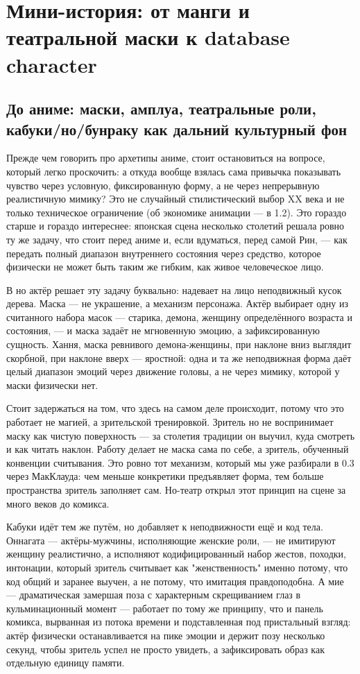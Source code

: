 \setcounter{chapter}{0}
\chapter{Мини-история: от манги и театральной маски к database character}

\section{До аниме: маски, амплуа, театральные роли, кабуки/но/бунраку как дальний культурный фон}

Прежде чем говорить про архетипы аниме, стоит остановиться на вопросе, который легко проскочить: а откуда вообще взялась сама привычка показывать чувство через условную, фиксированную форму, а не через непрерывную реалистичную мимику? Это не случайный стилистический выбор XX века и не только техническое ограничение (об экономике анимации — в 1.2). Это гораздо старше и гораздо интереснее: японская сцена несколько столетий решала ровно ту же задачу, что стоит перед аниме и, если вдуматься, перед самой Рин, — как передать полный диапазон внутреннего состояния через средство, которое физически не может быть таким же гибким, как живое человеческое лицо.

В но актёр решает эту задачу буквально: надевает на лицо неподвижный кусок дерева. Маска — не украшение, а механизм персонажа. Актёр выбирает одну из считанного набора масок — старика, демона, женщину определённого возраста и состояния, — и маска задаёт не мгновенную эмоцию, а зафиксированную сущность. Хання, маска ревнивого демона-женщины, при наклоне вниз выглядит скорбной, при наклоне вверх — яростной: одна и та же неподвижная форма даёт целый диапазон эмоций через движение головы, а не через мимику, которой у маски физически нет.

Стоит задержаться на том, что здесь на самом деле происходит, потому что это работает не магией, а зрительской тренировкой. Зритель но не воспринимает маску как чистую поверхность — за столетия традиции он выучил, куда смотреть и как читать наклон. Работу делает не маска сама по себе, а зритель, обученный конвенции считывания. Это ровно тот механизм, который мы уже разбирали в 0.3 через МакКлауда: чем меньше конкретики предъявляет форма, тем больше пространства зритель заполняет сам. Но-театр открыл этот принцип на сцене за много веков до комикса.

Кабуки идёт тем же путём, но добавляет к неподвижности ещё и код тела. Оннагата — актёры-мужчины, исполняющие женские роли, — не имитируют женщину реалистично, а исполняют кодифицированный набор жестов, походки, интонации, который зритель считывает как "женственность" именно потому, что код общий и заранее выучен, а не потому, что имитация правдоподобна. А мие — драматическая замершая поза с характерным скрещиванием глаз в кульминационный момент — работает по тому же принципу, что и панель комикса, вырванная из потока времени и подставленная под пристальный взгляд: актёр физически останавливается на пике эмоции и держит позу несколько секунд, чтобы зритель успел не просто увидеть, а зафиксировать образ как отдельную единицу памяти.

